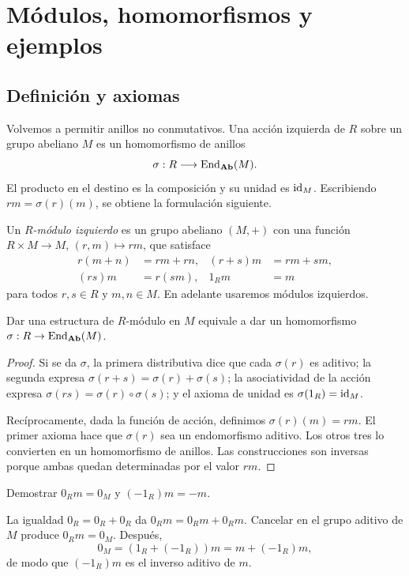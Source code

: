 \section{Módulos, homomorfismos y ejemplos}\label{sec:modulos-fundamentos}

\subsection{Definición y axiomas}\label{tema:13-2-1}
Volvemos a permitir anillos no conmutativos. Una acción izquierda de $R$ sobre un grupo abeliano $M$ es un homomorfismo de anillos
\[
\sigma:R\longrightarrow\operatorname{End}_{\mathbf{Ab}}(M).
\]
El producto en el destino es la composición y su unidad es $\operatorname{id}_M$. Escribiendo $rm=\sigma(r)(m)$, se obtiene la formulación siguiente.

\begin{defi}
Un \emph{$R$-módulo izquierdo} es un grupo abeliano $(M,+)$ con una función $R\times M\to M$, $(r,m)\mapsto rm$, que satisface
\[
\begin{aligned}
r(m+n)&=rm+rn,&(r+s)m&=rm+sm,\\
(rs)m&=r(sm),&1_Rm&=m
\end{aligned}
\]
para todos $r,s\in R$ y $m,n\in M$. En adelante usaremos módulos izquierdos.
\end{defi}

\begin{prop}\label{prop:C13-accion}
Dar una estructura de $R$-módulo en $M$ equivale a dar un homomorfismo $\sigma:R\to\operatorname{End}_{\mathbf{Ab}}(M)$.
\end{prop}
\begin{proof}
Si se da $\sigma$, la primera distributiva dice que cada $\sigma(r)$ es aditivo; la segunda expresa $\sigma(r+s)=\sigma(r)+\sigma(s)$; la asociatividad de la acción expresa $\sigma(rs)=\sigma(r)\circ\sigma(s)$; y el axioma de unidad es $\sigma(1_R)=\operatorname{id}_M$.

Recíprocamente, dada la función de acción, definimos $\sigma(r)(m)=rm$. El primer axioma hace que $\sigma(r)$ sea un endomorfismo aditivo. Los otros tres lo convierten en un homomorfismo de anillos. Las construcciones son inversas porque ambas quedan determinadas por el valor $rm$.
\end{proof}

\begin{ejer}\label{ejer:C13-cero}
Demostrar $0_Rm=0_M$ y $(-1_R)m=-m$.
\end{ejer}
\begin{sol}
La igualdad $0_R=0_R+0_R$ da $0_Rm=0_Rm+0_Rm$. Cancelar en el grupo aditivo de $M$ produce $0_Rm=0_M$. Después,
\[
0_M=(1_R+(-1_R))m=m+(-1_R)m,
\]
de modo que $(-1_R)m$ es el inverso aditivo de $m$.
\end{sol}

